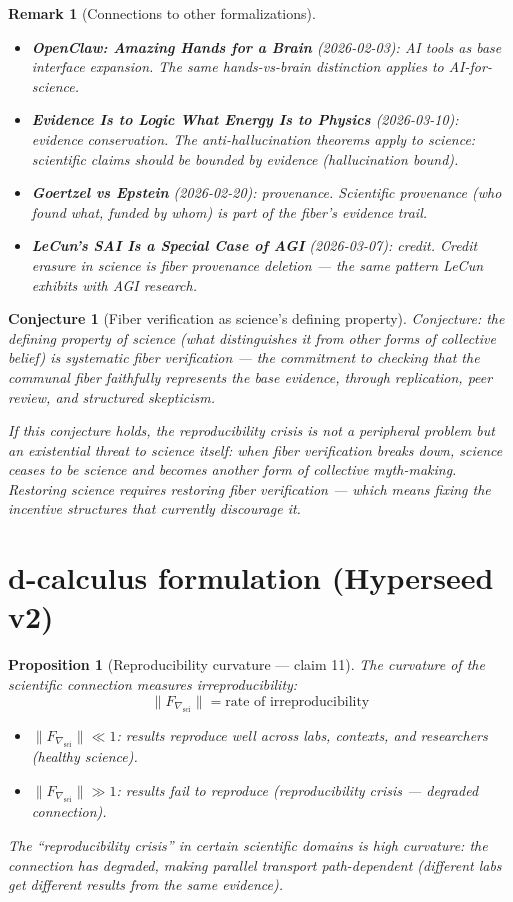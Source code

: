 \documentclass[11pt,a4paper]{article}
\newtheorem{proposition}[definition]{Proposition}
\newtheorem{remark}[definition]{Remark}
\newtheorem{conjecture}[definition]{Conjecture}
\begin{document}
\begin{remark}[Connections to other formalizations]
\begin{itemize}
\item \textbf{OpenClaw: Amazing Hands for a Brain} (2026-02-03): AI tools
  as base interface expansion. The same hands-vs-brain distinction applies
  to AI-for-science.
\item \textbf{Evidence Is to Logic What Energy Is to Physics} (2026-03-10):
  evidence conservation. The anti-hallucination theorems apply to science:
  scientific claims should be bounded by evidence (hallucination bound).
\item \textbf{Goertzel vs Epstein} (2026-02-20): provenance. Scientific
  provenance (who found what, funded by whom) is part of the fiber's
  evidence trail.
\item \textbf{LeCun's SAI Is a Special Case of AGI} (2026-03-07): credit.
  Credit erasure in science is fiber provenance deletion --- the same
  pattern LeCun exhibits with AGI research.
\end{itemize}
\end{remark}

\begin{conjecture}[Fiber verification as science's defining property]
Conjecture: the defining property of science (what distinguishes it from
other forms of collective belief) is systematic fiber verification ---
the commitment to checking that the communal fiber faithfully represents
the base evidence, through replication, peer review, and structured
skepticism.

If this conjecture holds, the reproducibility crisis is not a peripheral
problem but an existential threat to science itself: when fiber
verification breaks down, science ceases to be science and becomes
another form of collective myth-making. Restoring science requires
restoring fiber verification --- which means fixing the incentive
structures that currently discourage it.
\end{conjecture}

\section{d-calculus formulation (Hyperseed v2)}

\begin{proposition}[Reproducibility curvature --- claim 11]
\label{prop:reprod}
The curvature of the scientific connection measures irreproducibility:
\[
  \|F_{\nabla_{\text{sci}}}\| = \text{rate of irreproducibility}
\]
\begin{itemize}
  \item $\|F_{\nabla_{\text{sci}}}\| \ll 1$: results reproduce well
    across labs, contexts, and researchers (healthy science).
  \item $\|F_{\nabla_{\text{sci}}}\| \gg 1$: results fail to reproduce
    (reproducibility crisis --- degraded connection).
\end{itemize}
The ``reproducibility crisis'' in certain scientific domains is high
curvature: the connection has degraded, making parallel transport
path-dependent (different labs get different results from the same
evidence).
\end{proposition}
\end{document}

